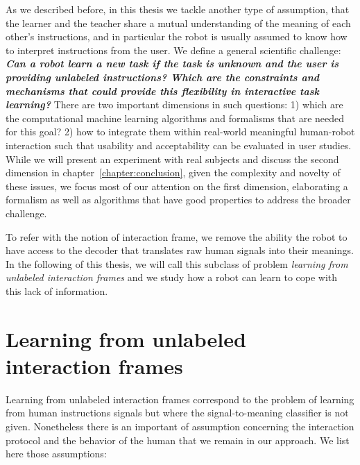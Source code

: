 As we described before, in this thesis we tackle another type of assumption, that the learner and the teacher share a mutual understanding of the meaning of each other's instructions, and in particular the robot is usually assumed to know how to interpret instructions from the user. We define a general scientific challenge: \textbf{\textit{Can a robot learn a new task if the task is unknown and the user is providing unlabeled instructions? Which are the constraints and mechanisms that could provide this flexibility in interactive task learning?}} There are two important dimensions in such questions: 1) which are the computational machine learning algorithms and formalisms that are needed for this goal? 2) how to integrate them within real-world meaningful human-robot interaction such that usability and acceptability can be evaluated in user studies. While we will present an experiment with real subjects and discuss the second dimension in chapter~\ref{chapter:conclusion}, given the complexity and novelty of these issues, we focus most of our attention on the first dimension, elaborating a formalism as well as algorithms that have good properties to address the broader challenge.

To refer with the notion of interaction frame, we remove the ability the robot to have access to the decoder that translates raw human signals into their meanings. In the following of this thesis, we will call this subclass of problem \emph{learning from unlabeled interaction frames} and we study how a robot can learn to cope with this lack of information.

\section{Learning from unlabeled interaction frames}

Learning from unlabeled interaction frames correspond to the problem of learning from human instructions signals but where the signal-to-meaning classifier is not given. Nonetheless there is an important of assumption concerning the interaction protocol and the behavior of the human that we remain in our approach. We list here those assumptions:


